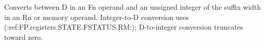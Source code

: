 Converts between D in an Fn operand and an unsigned integer of the suffix width in an Rn or memory operand.
Integer-to-D conversion uses (:ref:FP.registers.STATE.FSTATUS.RM:); D-to-integer conversion truncates toward zero.
